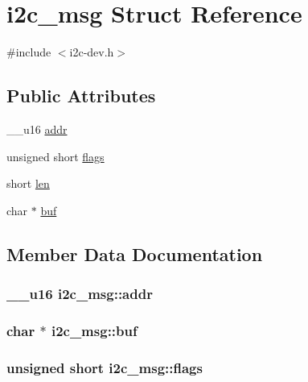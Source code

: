 \hypertarget{structi2c__msg}{}\section{i2c\+\_\+msg Struct Reference}
\label{structi2c__msg}


{\ttfamily \#include $<$i2c-\/dev.\+h$>$}

\subsection*{Public Attributes}
\begin{DoxyCompactItemize}
\item 
\+\_\+\+\_\+u16 \hyperlink{structi2c__msg_a9be257e05859e69552791192b68a8654}{addr}
\item 
unsigned short \hyperlink{structi2c__msg_a4b3bc1a36147fedfbdf9a15cc6ae88d9}{flags}
\item 
short \hyperlink{structi2c__msg_a10d1943df9a527109bf60733baf7b0a4}{len}
\item 
char $\ast$ \hyperlink{structi2c__msg_a14a546f5d8c9c52c9867d66733530210}{buf}
\end{DoxyCompactItemize}


\subsection{Member Data Documentation}
\hypertarget{structi2c__msg_a9be257e05859e69552791192b68a8654}{}
\subsubsection[{addr}]{\setlength{\rightskip}{0pt plus 5cm}\+\_\+\+\_\+u16 i2c\+\_\+msg\+::addr}\label{structi2c__msg_a9be257e05859e69552791192b68a8654}
\hypertarget{structi2c__msg_a14a546f5d8c9c52c9867d66733530210}{}
\subsubsection[{buf}]{\setlength{\rightskip}{0pt plus 5cm}char $\ast$ i2c\+\_\+msg\+::buf}\label{structi2c__msg_a14a546f5d8c9c52c9867d66733530210}
\hypertarget{structi2c__msg_a4b3bc1a36147fedfbdf9a15cc6ae88d9}{}
\subsubsection[{flags}]{\setlength{\rightskip}{0pt plus 5cm}unsigned short i2c\+\_\+msg\+::flags}\label{structi2c__msg_a4b3bc1a36147fedfbdf9a15cc6ae88d9}
\hypertarget{structi2c__msg_a10d1943df9a527109bf60733baf7b0a4}{}
